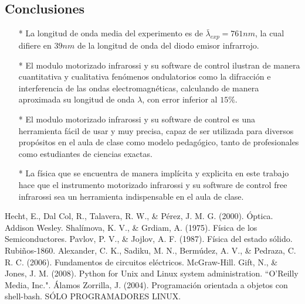 \documentclass[12]{article}
\begin{document}
\begin{multicols}{2}
\section{Conclusiones}
\begin{enumerate}
\item[*] La longitud de onda media del experimento es de $\bar{\lambda}_{exp} = 761 nm$, la cual difiere en $39 nm$ de la longitud de onda del diodo emisor infrarrojo.
\item[*] El modulo motorizado infrarossi y su software de control ilustran de manera cuantitativa y cualitativa fenómenos ondulatorios como la difracción e interferencia de las ondas electromagnéticas, calculando de manera aproximada su longitud de onda $\lambda$, con error inferior al $15\%$.   
\item[*] El modulo motorizado infrarossi y su software de control es una herramienta fácil de usar y muy precisa, capaz de ser utilizada para diversos propósitos en el aula de clase como modelo pedagógico,  tanto de profesionales como estudiantes de ciencias exactas.
\item[*] La física que se encuentra de manera implícita y explicita en este trabajo hace que el instrumento motorizado infrarossi y su software de control free infrarossi sea un herramienta indispensable  en el aula de clase.
\end{enumerate}
\vspace{1cm}
\begin{thebibliography}{99}
 Hecht, E., Dal Col, R., Talavera, R. W., \& Pérez, J. M. G. (2000). Óptica. Addison Wesley.
 Shalímova, K. V., \& Grdiam, A. (1975). Física de los Semiconductores.
 Pavlov, P. V., \& Jojlov, A. F. (1987). Física del estado sólido. Rubiños-1860.
 Alexander, C. K., Sadiku, M. N., Bermúdez, A. V., \& Pedraza, C. R. C. (2006). Fundamentos de circuitos eléctricos. McGraw-Hill. 
 Gift, N., \& Jones, J. M. (2008). Python for Unix and Linux system administration. ``O'Reilly Media, Inc.".
 Álamos Zorrilla, J. (2004). Programación orientada a objetos con shell-bash. SÓLO PROGRAMADORES LINUX.
\end{thebibliography}
\end{multicols}
\end{document}

